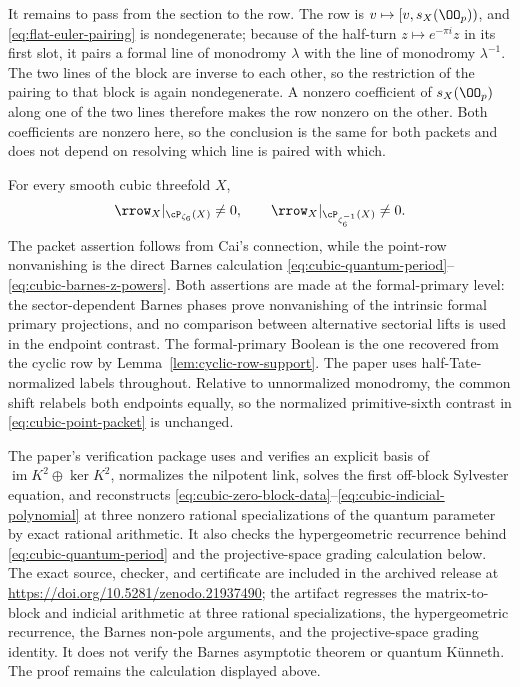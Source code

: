 It remains to pass from the section to the row.  The row is
\(v\mapsto[v,s_X(\OO_p))\), and \eqref{eq:flat-euler-pairing} is
nondegenerate; because of the half-turn \(z\mapsto e^{-\pi i}z\) in its first
slot, it pairs a formal line of monodromy \(\lambda\) with the line of
monodromy \(\lambda^{-1}\).  The two lines of the block are inverse to each
other, so the restriction of the pairing to that block is again
nondegenerate.  A nonzero coefficient of \(s_X(\OO_p)\) along
one of the two lines therefore makes the row nonzero on the other.  Both
coefficients are nonzero here, so the conclusion is the same for both packets
and does not depend on resolving which line is paired with which.

\begin{proposition}
\label{prop:cubic-endpoint}
For every smooth cubic threefold \(X\),
\begin{equation}\label{eq:cubic-point-packet}
 \rrow_X|_{\cP_{\zeta_6}(X)}\ne0,
 \qquad
 \rrow_X|_{\cP_{\zeta_6^{-1}}(X)}\ne0.
\end{equation}
The packet assertion follows from Cai's connection, while the point-row
nonvanishing is the direct Barnes calculation
\eqref{eq:cubic-quantum-period}--\eqref{eq:cubic-barnes-z-powers}.
Both assertions are made at the formal-primary level: the sector-dependent
Barnes phases prove nonvanishing of the intrinsic formal primary projections,
and no comparison between alternative sectorial lifts is used in the endpoint
contrast.  The
formal-primary Boolean is the one recovered from the cyclic row by
Lemma~\ref{lem:cyclic-row-support}.  The
paper uses half-Tate-normalized labels throughout.  Relative to unnormalized
monodromy, the common shift relabels both endpoints equally, so the normalized
primitive-sixth contrast in \eqref{eq:cubic-point-packet} is unchanged.
\end{proposition}

\begin{remark}
The paper's verification package uses and verifies an explicit basis of
\(\operatorname{im}K^2\oplus\ker K^2\), normalizes the nilpotent link, solves
the first off-block Sylvester equation, and reconstructs
\eqref{eq:cubic-zero-block-data}--\eqref{eq:cubic-indicial-polynomial} at
three nonzero rational specializations of the quantum parameter by exact
rational arithmetic.  It also checks the
hypergeometric recurrence behind \eqref{eq:cubic-quantum-period} and the
projective-space grading
calculation below.  The exact source, checker, and certificate are included
in the archived release at \url{https://doi.org/10.5281/zenodo.21937490}; the
artifact regresses the matrix-to-block and indicial arithmetic at three
rational specializations, the hypergeometric recurrence, the Barnes non-pole
arguments, and the projective-space grading identity.  It does not verify the
Barnes asymptotic theorem or quantum K\"unneth.  The proof remains the
calculation displayed above.
\end{remark}

